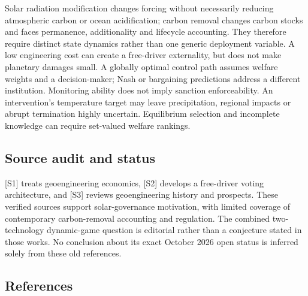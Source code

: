 \documentclass[11pt,a4paper]{article}
\begin{document}
Solar radiation modification changes forcing without necessarily reducing atmospheric carbon or ocean acidification; carbon removal changes carbon stocks and faces permanence, additionality and lifecycle accounting. They therefore require distinct state dynamics rather than one generic deployment variable. A low engineering cost can create a free-driver externality, but does not make planetary damages small. A globally optimal control path assumes welfare weights and a decision-maker; Nash or bargaining predictions address a different institution. Monitoring ability does not imply sanction enforceability. An intervention's temperature target may leave precipitation, regional impacts or abrupt termination highly uncertain. Equilibrium selection and incomplete knowledge can require set-valued welfare rankings.

\subsection*{Source audit and status}

[S1] treats geoengineering economics, [S2] develops a free-driver voting architecture, and [S3] reviews geoengineering history and prospects. These verified sources support solar-governance motivation, with limited coverage of contemporary carbon-removal accounting and regulation. The combined two-technology dynamic-game question is editorial rather than a conjecture stated in those works. No conclusion about its exact October 2026 open status is inferred solely from these old references.

\subsection*{References}
\end{document}
